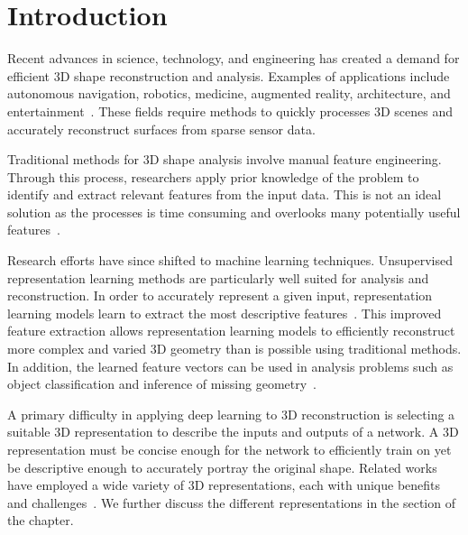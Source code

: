 
\chapter{Introduction}
\label{chap:introduction}

Recent advances in science, technology, and engineering has created a demand for efficient 3D shape reconstruction and analysis. Examples of applications include autonomous navigation, robotics, medicine, augmented reality, architecture, and entertainment~\cite{Xiao2020, Xie2022}. These fields require methods to quickly processes 3D scenes and accurately reconstruct surfaces from sparse sensor data.

Traditional methods for 3D shape analysis involve manual feature engineering. Through this process, researchers apply prior knowledge of the problem to identify and extract relevant features from the input data. This is not an ideal solution as the processes is time consuming and overlooks many potentially useful features~\cite{Bengio2013}.

Research efforts have since shifted to machine learning techniques. Unsupervised representation learning methods are particularly well suited for analysis and reconstruction. In order to accurately represent a given input, representation learning models learn to extract the most descriptive features~\cite{Bengio2013}. This improved feature extraction allows representation learning models to efficiently reconstruct more complex and varied 3D geometry than is possible using traditional methods. In addition, the learned feature vectors can be used in analysis problems such as object classification and inference of missing geometry~\cite{Park2019}.

A primary difficulty in applying deep learning to 3D reconstruction is selecting a suitable 3D representation to describe the inputs and outputs of a network. A 3D representation must be concise enough for the network to efficiently train on yet be descriptive enough to accurately portray the original shape. Related works have employed a wide variety of 3D representations, each with unique benefits and challenges~\cite{Xiao2020}. We further discuss the different representations in the  section of the  chapter.

